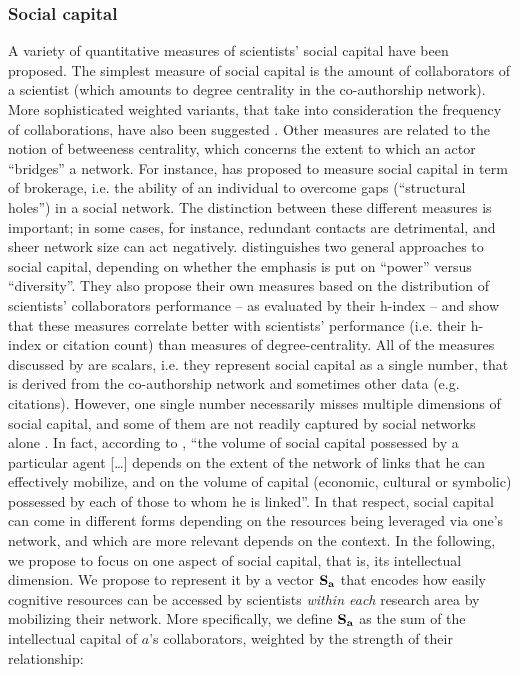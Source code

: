 \documentclass{article}
\begin{document}
\subsubsection{Social capital}

A variety of quantitative measures of scientists' social capital have been proposed\citep{Abbasi2014,Schirone2023}. The simplest measure of social capital is the amount of collaborators of a scientist (which amounts to degree centrality in the co-authorship network). More sophisticated weighted variants, that take into consideration the frequency of collaborations, have also been suggested \citep{Abbasi2014}. Other measures are related to the notion of betweeness centrality, which concerns the extent to which an actor ``bridges'' a network. For instance, \citet{BurtBrokerage2007} has proposed to measure social capital in term of brokerage, i.e. the ability of an individual to overcome gaps (``structural holes'') in a social network. The distinction between these different measures is important; in some cases, for instance, redundant contacts are detrimental, and sheer network size can act negatively. \citet{Abbasi2014} distinguishes two general approaches to social capital, depending on whether the emphasis is put on ``power'' versus ``diversity''. They also propose their own measures based on the distribution of scientists' collaborators performance -- as evaluated by their h-index -- and show that these measures correlate better with scientists' performance (i.e. their h-index or citation count) than measures of degree-centrality. All of the measures discussed by \citet{Abbasi2014} are scalars, i.e. they represent social capital as a single number, that is derived from the co-authorship network and sometimes other data (e.g. citations). However, one single number necessarily misses multiple dimensions of social capital, and some of them are not readily captured by social networks alone \citep{MartnAlczar2019}. In fact, according to \citet{Bourdieu1980}, ``the volume of social capital possessed by a particular agent [\dots] depends on the extent of the network of links that he can effectively mobilize, and on the volume of capital (economic, cultural or symbolic) possessed by each of those to whom he is linked''. In that respect, social capital can come in different forms depending on the resources being leveraged via one's network, and which are more relevant depends on the context. In the following, we propose to focus on one aspect of social capital, that is, its intellectual dimension. We propose to represent it by a vector $\bf{S}_{a}$ that encodes how easily cognitive resources can be accessed by scientists \textit{within each} research area by mobilizing their network. %
More specifically, we define $\bf{S}_{a}$ as the sum of the intellectual capital of $a$'s collaborators, weighted by the strength of their relationship:
\end{document}
